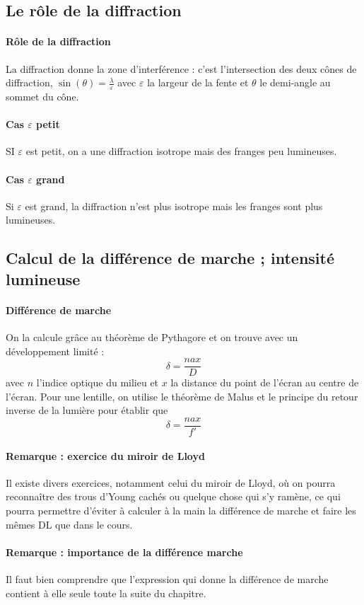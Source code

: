 \documentclass[french]{book}
\theoremstyle{plain}
\theoremstyle{definition}
\theoremstyle{remark}
\begin{document}
\subsection{Le rôle de la diffraction}
\paragraph{Rôle de la diffraction} La diffraction donne la zone d’interférence : c'est l'intersection des deux cônes de diffraction, $\sin(\theta)=\displaystyle\frac{\lambda}{\varepsilon}$ avec $\varepsilon$ la largeur de la fente et $\theta$ le demi-angle au sommet du cône.
\paragraph{Cas $\varepsilon$ petit} SI $\varepsilon$ est petit, on a une diffraction isotrope mais des franges peu lumineuses.
\paragraph{Cas $\varepsilon$ grand} Si $\varepsilon$ est grand, la diffraction n'est plus isotrope mais les franges sont plus lumineuses.
\subsection{Calcul de la différence de marche ; intensité lumineuse}
\paragraph{Différence de marche} On la calcule grâce au théorème de Pythagore et on trouve avec un développement limité : $$\delta=\frac{nax}{D}$$ avec $n$ l'indice optique du milieu et $x$ la distance du point de l'écran au centre de l'écran. Pour une lentille, on utilise le théorème de Malus et le principe du retour inverse de la lumière pour établir que $$\delta=\frac{nax}{f'}$$
\paragraph{Remarque : exercice du miroir de Lloyd} Il existe divers exercices, notamment celui du miroir de Lloyd, où on pourra reconnaître des trous d'Young cachés ou quelque chose qui s'y ramène, ce qui pourra permettre d'éviter à calculer à la main la différence de marche et faire les mêmes DL que dans le cours.
\paragraph{Remarque : importance de la différence marche} Il faut bien comprendre que l'expression qui donne la différence de marche contient à elle seule toute la suite du chapitre.
\end{document}
